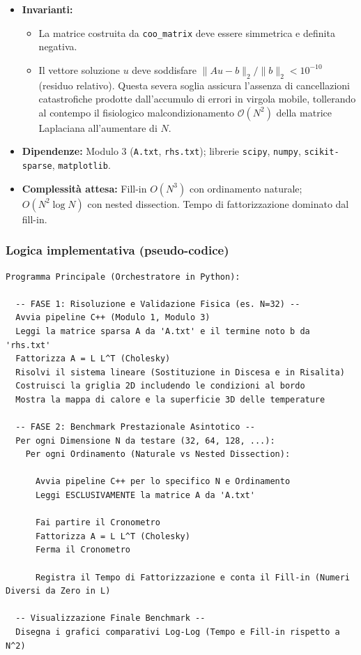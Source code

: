 \documentclass[a4paper,12pt]{article}
\begin{document}
\begin{itemize}
\begin{itemize}
    \end{itemize}
  \item \textbf{Invarianti:}
    \begin{itemize}
      \item La matrice costruita da \texttt{coo\_matrix} deve essere simmetrica e definita negativa.
      \item Il vettore soluzione $u$ deve soddisfare $\|Au - b\|_2 / \|b\|_2 < 10^{-10}$ (residuo relativo). Questa severa soglia assicura l'assenza di cancellazioni catastrofiche prodotte dall'accumulo di errori in virgola mobile, tollerando al contempo il fisiologico malcondizionamento $\mathcal{O}(N^2)$ della matrice Laplaciana all'aumentare di $N$.
    \end{itemize}
  \item \textbf{Dipendenze:} Modulo 3 (\texttt{A.txt}, \texttt{rhs.txt}); librerie \texttt{scipy}, \texttt{numpy}, \texttt{scikit-sparse}, \texttt{matplotlib}.
  \item \textbf{Complessità attesa:} Fill-in $O(N^3)$ con ordinamento naturale; $O(N^2 \log N)$ con nested dissection. Tempo di fattorizzazione dominato dal fill-in.
\end{itemize}

\subsubsection*{Logica implementativa (pseudo-codice)}
\begin{minipage}{\linewidth}
\begin{lstlisting}
Programma Principale (Orchestratore in Python):

  -- FASE 1: Risoluzione e Validazione Fisica (es. N=32) --
  Avvia pipeline C++ (Modulo 1, Modulo 3)
  Leggi la matrice sparsa A da 'A.txt' e il termine noto b da 'rhs.txt'
  Fattorizza A = L L^T (Cholesky)
  Risolvi il sistema lineare (Sostituzione in Discesa e in Risalita)
  Costruisci la griglia 2D includendo le condizioni al bordo
  Mostra la mappa di calore e la superficie 3D delle temperature
  
  -- FASE 2: Benchmark Prestazionale Asintotico --
  Per ogni Dimensione N da testare (32, 64, 128, ...):
    Per ogni Ordinamento (Naturale vs Nested Dissection):
      
      Avvia pipeline C++ per lo specifico N e Ordinamento
      Leggi ESCLUSIVAMENTE la matrice A da 'A.txt'
      
      Fai partire il Cronometro
      Fattorizza A = L L^T (Cholesky)
      Ferma il Cronometro
      
      Registra il Tempo di Fattorizzazione e conta il Fill-in (Numeri Diversi da Zero in L)
      
  -- Visualizzazione Finale Benchmark --
  Disegna i grafici comparativi Log-Log (Tempo e Fill-in rispetto a N^2)
\end{lstlisting}
\end{minipage}
\end{document}
